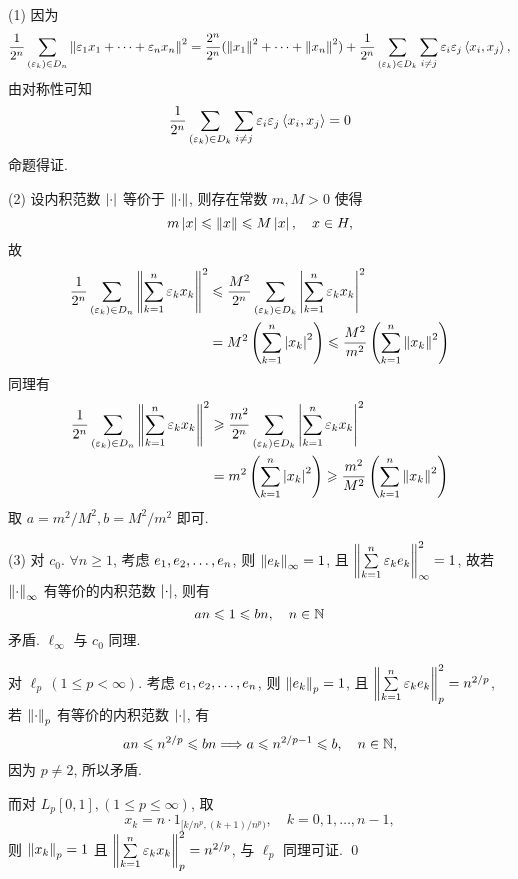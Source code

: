     \begin{Proof}
        (1) 因为
        \[
            \frac{1}{2^{n}}\sum_{(\varepsilon_{k})\in D_{n}}\left\| \varepsilon_{1}x_{1}+\cdots+\varepsilon_{n}x_{n} \right\|^{2}=\frac{2^{n}}{2^{n}}(\left\| x_{1} \right\|^{2}+\cdots+\left\| x_{n} \right\|^{2})+\frac{1}{2^{n}}\sum_{(\varepsilon_{k})\in D_{k}}\sum_{i\ne j}\varepsilon_{i}\varepsilon_{j}\left\langle x_{i}, x_{j} \right\rangle,
        \]
        由对称性可知 
        \[
            \frac{1}{2^{n}}\sum_{(\varepsilon_{k})\in D_{k}}\sum_{i\ne j}\varepsilon_{i}\varepsilon_{j}\left\langle x_{i}, x_{j} \right\rangle=0
        \]
        命题得证. 

        (2) 设内积范数 $ \left| \cdot \right|  $ 等价于 $ \left\| \cdot \right\| $, 则存在常数 $ m, M>0 $ 使得
        \[
            m\left| x \right| \leqslant\left\| x \right\|\leqslant M\left| x \right| , \quad x\in H,
        \]
        故 
        \[
            \begin{aligned}
                \frac{1}{2^{n}}\sum_{(\varepsilon_{k})\in D_{n}}\left\| \sum_{k=1}^{n}\varepsilon_{k}x_{k} \right\|^{2} & \leqslant \frac{M^{2}}{2^{n}}\sum_{(\varepsilon_{k})\in D_{k}}\left| \sum_{k=1}^{n}\varepsilon_{k}x_{k} \right| ^{2}  \\
                & = M^{2}\left(\sum_{k=1}^{n}\left| x_{k} \right| ^{2}\right)\leqslant \frac{M^{2}}{m^{2}}\left(\sum_{k=1}^{n}\left\| x_{k} \right\|^{2}\right)
            \end{aligned}
        \]
        同理有
        \[
            \begin{aligned}
                \frac{1}{2^{n}}\sum_{\left(\varepsilon_{k}\right)\in D_{n}}\left\| \sum_{k=1}^{n}\varepsilon_{k}x_{k} \right\|^{2} & \geqslant \frac{m^{2}}{2^{n}}\sum_{\left(\varepsilon_{k}\right)\in D_{k}}\left| \sum_{k=1}^{n}\varepsilon_{k}x_{k} \right| ^{2}  \\
                 & = m^{2}\left(\sum_{k=1}^{n}\left| x_{k} \right| ^{2}\right)\geqslant \frac{m^{2}}{M^{2}}\left(\sum_{k=1}^{n}\left\| x_{k} \right\|^{2}\right)
            \end{aligned}
        \]
        取 $ a=m^{2}/M^{2}, b=M^{2}/m^{2} $ 即可. 

        (3) 对 $ c_{0} $. $ \forall n\geqslant1 $, 考虑 $ e_{1}, e_{2}, \dots, e_{n} $, 则 $ \left\| e_{k} \right\|_{\infty}=1 $, 且 $ \left\| \sum\limits_{k=1}^{n}\varepsilon_{k}e_{k} \right\|_{\infty}^{2}=1 $, 故若 $ \left\| \cdot \right\|_{\infty} $ 有等价的内积范数 $ \left| \cdot \right|  $, 则有
        \[
            an\leqslant1\leqslant bn, \quad n\in\mathbb{N}
        \]
        矛盾. $ \ell_{\infty} $ 与 $ c_{0} $ 同理. 

        对 $ \ell_{p}\,(1\leqslant p<\infty) $. 考虑 $ e_{1}, e_{2}, \dots, e_{n} $, 则 $ \left\| e_{k} \right\|_{p}=1 $, 且 $ \left\| \sum\limits_{k=1}^{n}\varepsilon_{k}e_{k} \right\|^{2}_{p}=n^{2/p} $, 若 $ \left\| \cdot \right\|_{p} $ 有等价的内积范数 $ \left| \cdot \right|  $, 有
        \[
            an\leqslant n^{2/p} \leqslant bn\Longrightarrow a\leqslant n^{2/p-1}\leqslant b, \quad n\in\mathbb{N},
        \]
        因为 $ p\ne 2 $, 所以矛盾. 

        而对 $ L_{p}[0, 1], (1\leqslant p\leqslant\infty) $, 取
        \[
            x_{k}=n\cdot1_{[{k}/{n^p}, ({k+1})/{n^p})}, \quad k = 0, 1, \dots, n-1,
        \]
        则 $ \left\| x_{k} \right\|_{p}=1 $ 且 $ \left\| \sum\limits_{k=1}^{n}\varepsilon_{k}x_{k} \right\|_{p}^{2}=n^{2/p} $, 与 $ \ell_{p} $ 同理可证. \qed
    \end{Proof}

